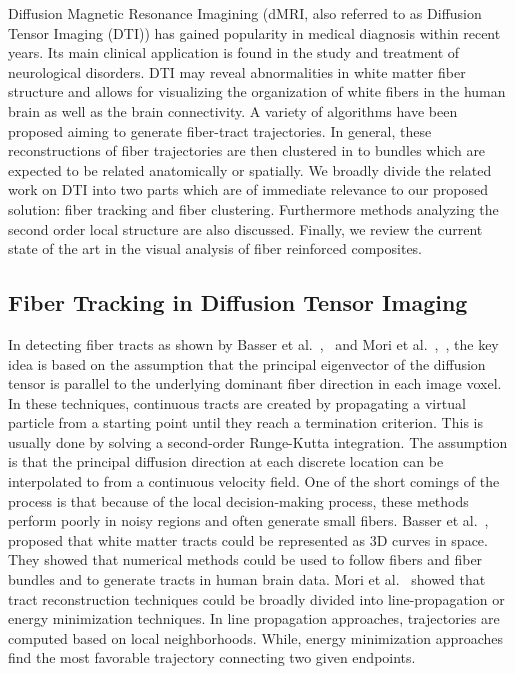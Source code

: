 Diffusion Magnetic Resonance Imagining (dMRI, also referred to as Diffusion Tensor Imaging (DTI)) has gained popularity in medical diagnosis within recent years. Its main clinical application is found in the study and treatment of neurological disorders. DTI may reveal abnormalities in white matter fiber structure and allows for visualizing the organization of white fibers in the human brain as well as the brain connectivity.
A variety of algorithms have been proposed aiming to generate fiber-tract trajectories. In general, these reconstructions of fiber trajectories are then clustered in to bundles which are expected to be related anatomically or spatially. 
We broadly divide the related work on DTI into two parts which are of immediate relevance to our proposed solution: fiber tracking and fiber clustering. Furthermore methods analyzing the second order local structure are also discussed. Finally, we review the current state of the art in the visual analysis of fiber reinforced composites.


\subsection {Fiber Tracking in Diffusion Tensor Imaging}
\label{subsec:fiberEx} 
In detecting fiber tracts as shown by Basser et al.~\cite{Basser2000},~\cite{Basser2002} and Mori et al.~\cite{Mori2002},~\cite{Mori1999}, the key idea is based on the assumption that the principal eigenvector of the diffusion tensor is parallel to the underlying dominant fiber direction in each image voxel. In these techniques, continuous tracts are created by propagating a virtual particle from a starting point until they reach a termination criterion. This is usually done by solving a second-order Runge-Kutta integration. The assumption is that the principal diffusion direction at each discrete location can be interpolated to from a continuous velocity field. One of the short comings of the process is that because of the local decision-making process, these methods perform poorly in noisy regions and often generate small fibers. Basser et al.~\cite{Basser2000},~\cite{Basser2002} proposed that white matter tracts could be represented as 3D curves in space. They showed that numerical methods could be used to follow fibers and fiber bundles and to generate tracts in human brain data. 
Mori et al.~\cite{Mori2002} showed that tract reconstruction techniques could be broadly divided into line-propagation or energy minimization techniques. In line propagation approaches, trajectories are computed based on local neighborhoods. While, energy minimization approaches find the most favorable trajectory connecting two given endpoints. 


